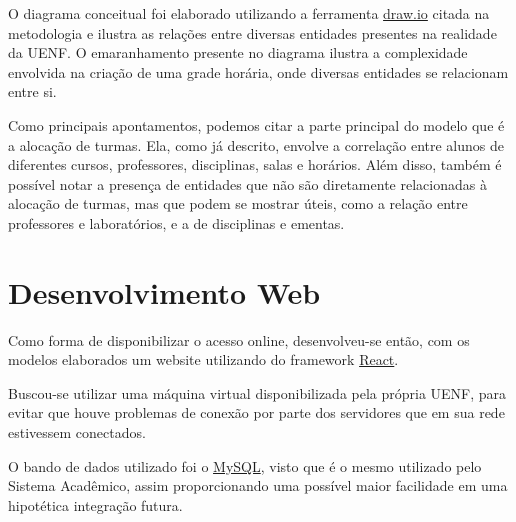 
    O diagrama conceitual foi elaborado utilizando a ferramenta \href{https://www.drawio.com/}{draw.io} citada na metodologia e ilustra as relações entre diversas entidades presentes na realidade da UENF. O emaranhamento presente no diagrama ilustra a complexidade envolvida na criação de uma grade horária, onde diversas entidades se relacionam entre si.

    Como principais apontamentos, podemos citar a parte principal do modelo que é a alocação de turmas. Ela, como já descrito, envolve a correlação entre alunos de diferentes cursos, professores, disciplinas, salas e horários. Além disso, também é possível notar a presença de entidades que não são diretamente relacionadas à alocação de turmas, mas que podem se mostrar úteis, como a relação entre professores e laboratórios, e a de disciplinas e ementas.

\section{Desenvolvimento Web} %

    Como forma de disponibilizar o acesso online, desenvolveu-se então, com os modelos elaborados um website utilizando do framework \href{https://react.dev/}{React}.

    Buscou-se utilizar uma máquina virtual disponibilizada pela própria UENF, para evitar que houve problemas de conexão por parte dos servidores que em sua rede estivessem conectados.

    O bando de dados utilizado foi o \href{https://dev.mysql.com/}{MySQL}, visto que é o mesmo utilizado pelo Sistema Acadêmico, assim proporcionando uma possível maior facilidade em uma hipotética integração futura.

